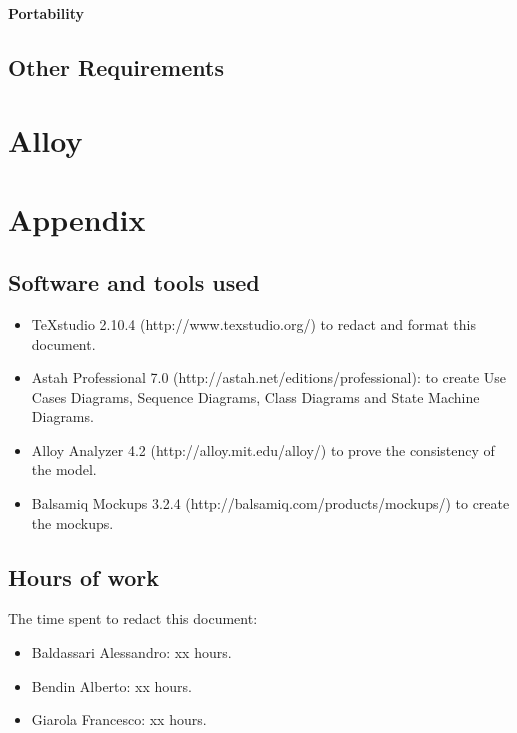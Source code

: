 \documentclass[a4paper,11pt]{report} %
\begin{document}
	\paragraph{Portability}
	
	\subsection{Other Requirements}
	
	\pagebreak

	\section{Alloy}
	
	
	\pagebreak
	
	\section{Appendix}
	
	\subsection{Software and tools used}
	\begin{itemize}
		\item TeXstudio 2.10.4 (http://www.texstudio.org/) to redact and format this document.
		\item Astah Professional 7.0 (http://astah.net/editions/professional): to create Use
		Cases Diagrams, Sequence Diagrams, Class Diagrams and State Machine	Diagrams.
		\item Alloy Analyzer 4.2 (http://alloy.mit.edu/alloy/) to prove the consistency of
		the model.
		\item Balsamiq Mockups 3.2.4 (http://balsamiq.com/products/mockups/) to create the mockups.
	\end{itemize}
	
	\subsection{Hours of work} The time spent to redact this document:
	\begin{itemize}
		\item Baldassari Alessandro: xx hours.
		\item Bendin Alberto: xx hours.
		\item Giarola Francesco: xx hours.
	\end{itemize}
	
	
\end{document}
